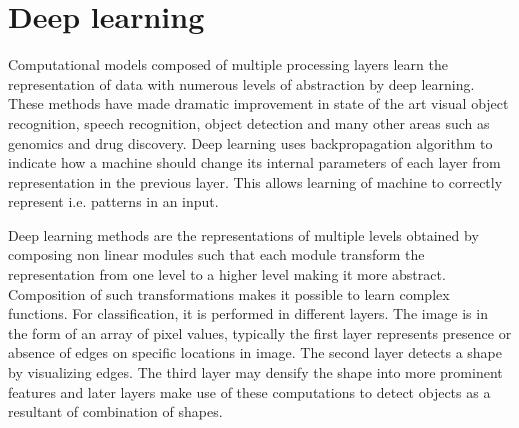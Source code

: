 \documentclass[11pt]{article}
\begin{document}
\newpage 





\tableofcontents

\newpage



\iffalse

\section{Deep learning}
Computational models composed of multiple processing layers learn the representation of data with numerous levels of abstraction by deep learning. These methods have made dramatic improvement in state of the art visual object recognition, speech recognition, object detection and many other areas such as genomics and drug discovery. Deep learning uses backpropagation algorithm to indicate how a machine should change its internal parameters of each layer from representation in the previous layer. This allows learning of machine to correctly represent i.e. patterns in an input.

\par
Deep learning methods are the representations of multiple levels obtained by composing non linear modules such that each module transform the representation from one level to a higher level making it more abstract. Composition of such transformations makes it possible to learn complex functions. For classification, it is performed in different layers. The image is in the form of an array of pixel values, typically the first layer represents presence or absence of edges on specific locations in image.  The second layer detects a shape by visualizing edges. The third layer may densify the shape into more prominent features and later layers make use of these computations to detect objects as a resultant of combination of shapes.
\end{document}
